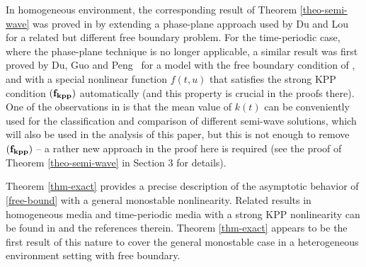 \documentclass[11pt]{amsart}
\numberwithin{equation}{section}
\begin{document}
 In  homogeneous environment, the corresponding result of Theorem \ref{theo-semi-wave} was proved in \cite{D} by extending a phase-plane approach used by Du and Lou~\cite{DL15} for a related but different free boundary problem.  For the time-periodic case, where the phase-plane technique is no longer applicable, a similar result was first proved by Du, Guo and Peng~\cite{DGP} for a model with the  free boundary condition of \cite{DL15}, and with a special nonlinear function $f(t,u)$ that satisfies the strong KPP condition ${\bf (f_{kpp})}$ automatically (and this property is crucial in the proofs there). One of the observations in \cite{DGP} is that the mean value of  $k(t)$ can be conveniently used for the classification and comparison of different semi-wave solutions, which will also be used in the analysis of this paper, but this is not enough to remove ${\bf (f_{kpp})}$ -- a rather new approach in the proof here is required (see the proof of Theorem \ref{theo-semi-wave} in Section 3 for details).

Theorem \ref{thm-exact} provides  a precise description of the asymptotic behavior of \eqref{free-bound} with a general monostable nonlinearity. Related results in homogeneous media and time-periodic media with a strong KPP nonlinearity can be found in \cite{D, DLNN, DMZ, DLZ15, DMZ2, SLZ,DGP} and the references therein. Theorem \ref{thm-exact} appears to be the first result of this nature to cover the general monostable case in a heterogeneous environment setting with free boundary. 
\end{document}
